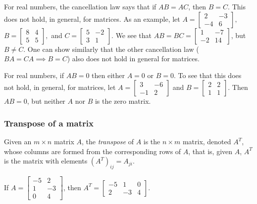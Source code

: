 \documentclass[12pt,letterpaper,reqno]{article}
\numberwithin{equation}{section}
\newcommand{\ti}[1]{\textit{#1}}
\begin{document}
\begin{example}
For real numbers, the cancellation law says that if $AB=AC$, then $B=C$. This does not hold, in general, for matrices. As an example, let $A=\begin{bmatrix}
		2&-3\\-4&6
	\end{bmatrix},$ $B=\begin{bmatrix}
		8&4\\5&5
	\end{bmatrix},$ and $C=\begin{bmatrix}
		5&-2\\3&1
	\end{bmatrix}$.	We see that $AB=BC=\begin{bmatrix}
	1 & -7 \\ -2 & 14
\end{bmatrix}$, but $B \neq C$. One can show similarly that the other cancellation law ($BA=CA \implies B=C$) also does not hold in general for matrices.
\end{example}

\begin{example}
	For real numbers, if $AB=0$ then either $A=0$ or $B=0$. To see that this does not hold, in general, for matrices, let $A=\begin{bmatrix}
		3&-6 \\ -1&2
	\end{bmatrix}$ and $B=\begin{bmatrix}
	2 & 2 \\ 1 & 1
\end{bmatrix}$. Then $AB=0$, but neither $A$ nor $B$ is the zero matrix. 
\end{example}

\subsubsection{Transpose of a matrix}

\begin{defn}
	Given an $m \times n$ matrix $A$, the \ti{transpose} of $A$ is the $n \times m$ matrix, denoted $A^T$, whose columns are formed from the corresponding rows of $A$, that is, given $A$, $A^T$ is the matrix with elements $(A^T)_{ij}=A_{ji}$. 
\end{defn}

\begin{example}
	If $A=\begin{bmatrix}
	-5&2\\1&-3 \\ 0&4
\end{bmatrix}$, then $A^T=\begin{bmatrix}
	-5&1&0 \\ 2&-3&4
\end{bmatrix}$.
\end{example}
\end{document}
